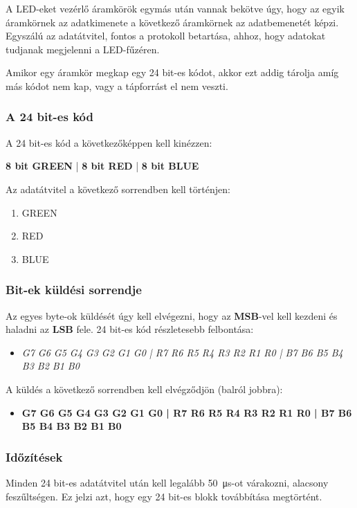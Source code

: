 \tab A LED-eket vezérlő áramkörök egymás után vannak bekötve úgy, hogy az egyik áramkörnek az adatkimenete a következő áramkörnek az adatbemenetét képzi.
Egyszálú az adatátvitel, fontos a protokoll betartása, ahhoz, hogy adatokat tudjanak megjelenni a LED-fűzéren.

\tab Amikor egy áramkör megkap egy 24 bit-es kódot, akkor ezt addig tárolja amíg más kódot nem kap, vagy a tápforrást el nem veszti.

\subsubsection{A 24 bit-es kód}

\tab A 24 bit-es kód a következőképpen kell kinézzen: 

\tab \textbf{8 bit GREEN} | \textbf{8 bit RED} | \textbf{8 bit BLUE}

\tab Az adatátvitel a következő sorrendben kell történjen: 
\begin{enumerate}
\item GREEN
\item RED
\item BLUE
\end{enumerate}

\subsubsection{Bit-ek küldési sorrendje}

\tab Az egyes byte-ok küldését úgy kell elvégezni, hogy az \textbf{MSB}-vel kell kezdeni és haladni az \textbf{LSB} fele. 
24 bit-es kód részletesebb felbontása: 
\begin{itemize}
\item \textit{G7 G6 G5 G4 G3 G2 G1 G0 | R7 R6 R5 R4 R3 R2 R1 R0 | B7 B6 B5 B4 B3 B2 B1 B0}
\end{itemize}

\tab A küldés a következő sorrendben kell elvégződjön (balról jobbra): 
\begin{itemize}
\item \textbf{G7 G6 G5 G4 G3 G2 G1 G0 | R7 R6 R5 R4 R3 R2 R1 R0 | B7 B6 B5 B4 B3 B2 B1 B0}
\end{itemize}

\subsubsection{Időzítések}

\tab Minden 24 bit-es adatátvitel után kell legalább \SI{50}{\micro\second}-ot várakozni, alacsony feszűltségen. Ez jelzi azt, hogy egy 24 bit-es blokk továbbítása megtörtént.

